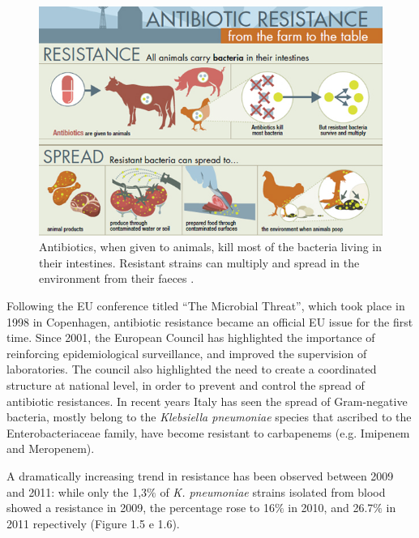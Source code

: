 \documentclass[11pt]{report}
\begin{document}
\begin{figure}[htp]
\centering
\includegraphics[scale=0.57]{img/Agricultural_Spread.jpg}
\caption{Antibiotics, when given to animals, kill most of the bacteria living in their intestines. Resistant strains can multiply and spread in the environment from their faeces \cite{CDC_AntibioticResistance}.}
\label{}
\end{figure}

\clearpage
Following the EU conference titled “The Microbial Threat”, which took place in 1998 in Copenhagen, antibiotic resistance became an official EU issue for the first time.
Since 2001, the European Council has highlighted the importance of reinforcing epidemiological surveillance, and improved the supervision of laboratories. The council also highlighted the need to create a coordinated structure at national level, in order to prevent and control the spread of antibiotic resistances.
In recent years Italy has seen the spread of Gram-negative bacteria, mostly belong to the \emph{Klebsiella pneumoniae} species that ascribed to the Enterobacteriaceae family, have become resistant to carbapenems (e.g. Imipenem and Meropenem).

A dramatically increasing trend in resistance has been observed between 2009 and 2011: while only the 1,3$\%$ of \emph{K. pneumoniae} strains isolated from blood showed a resistance in 2009, the percentage rose to 16$\%$ in 2010, and 26.7$\%$ in 2011 repectively (Figure 1.5 e 1.6).
\end{document}
